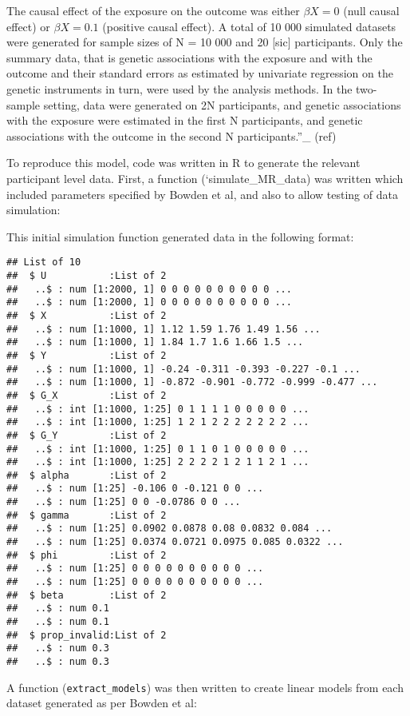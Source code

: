 \documentclass[
]{article}
\begin{document}
The causal effect of the exposure on the outcome was either
\(\beta X = 0\) (null causal effect) or \(\beta X = 0.1\) (positive
causal effect). A total of 10 000 simulated datasets were generated for
sample sizes of N = 10 000 and 20 {[}sic{]} participants. Only the
summary data, that is genetic associations with the exposure and with
the outcome and their standard errors as estimated by univariate
regression on the genetic instruments in turn, were used by the analysis
methods. In the two-sample setting, data were generated on 2N
participants, and genetic associations with the exposure were estimated
in the first N participants, and genetic associations with the outcome
in the second N participants.''\_ (ref)

To reproduce this model, code was written in R to generate the relevant
participant level data. First, a function (`simulate\_MR\_data) was
written which included parameters specified by Bowden et al, and also to
allow testing of data simulation:

This initial simulation function generated data in the following format:

\begin{verbatim}
## List of 10
##  $ U           :List of 2
##   ..$ : num [1:2000, 1] 0 0 0 0 0 0 0 0 0 0 ...
##   ..$ : num [1:2000, 1] 0 0 0 0 0 0 0 0 0 0 ...
##  $ X           :List of 2
##   ..$ : num [1:1000, 1] 1.12 1.59 1.76 1.49 1.56 ...
##   ..$ : num [1:1000, 1] 1.84 1.7 1.6 1.66 1.5 ...
##  $ Y           :List of 2
##   ..$ : num [1:1000, 1] -0.24 -0.311 -0.393 -0.227 -0.1 ...
##   ..$ : num [1:1000, 1] -0.872 -0.901 -0.772 -0.999 -0.477 ...
##  $ G_X         :List of 2
##   ..$ : int [1:1000, 1:25] 0 1 1 1 1 0 0 0 0 0 ...
##   ..$ : int [1:1000, 1:25] 1 2 1 2 2 2 2 2 2 2 ...
##  $ G_Y         :List of 2
##   ..$ : int [1:1000, 1:25] 0 1 1 0 1 0 0 0 0 0 ...
##   ..$ : int [1:1000, 1:25] 2 2 2 2 1 2 1 1 2 1 ...
##  $ alpha       :List of 2
##   ..$ : num [1:25] -0.106 0 -0.121 0 0 ...
##   ..$ : num [1:25] 0 0 -0.0786 0 0 ...
##  $ gamma       :List of 2
##   ..$ : num [1:25] 0.0902 0.0878 0.08 0.0832 0.084 ...
##   ..$ : num [1:25] 0.0374 0.0721 0.0975 0.085 0.0322 ...
##  $ phi         :List of 2
##   ..$ : num [1:25] 0 0 0 0 0 0 0 0 0 0 ...
##   ..$ : num [1:25] 0 0 0 0 0 0 0 0 0 0 ...
##  $ beta        :List of 2
##   ..$ : num 0.1
##   ..$ : num 0.1
##  $ prop_invalid:List of 2
##   ..$ : num 0.3
##   ..$ : num 0.3
\end{verbatim}

A function (\texttt{extract\_models}) was then written to create linear
models from each dataset generated as per Bowden et al:
\end{document}
